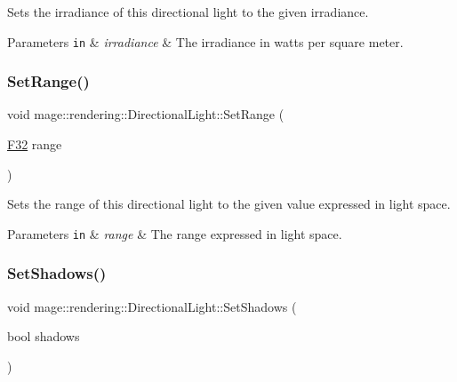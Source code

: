 Sets the irradiance of this directional light to the given irradiance.


\begin{DoxyParams}[1]{Parameters}
\mbox{\tt in}  & {\em irradiance} & The irradiance in watts per square meter. \\
\hline
\end{DoxyParams}
\mbox{\label{classmage_1_1rendering_1_1_directional_light_a4cfe435db538b10a6bc3aeab9c71dd45}} 
\subsubsection{\texorpdfstring{Set\+Range()}{SetRange()}}
{\footnotesize\ttfamily void mage\+::rendering\+::\+Directional\+Light\+::\+Set\+Range (\begin{DoxyParamCaption}\item[{\mbox{\hyperlink{namespacemage_aa97e833b45f06d60a0a9c4fc22ae02c0}{F32}}}]{range }\end{DoxyParamCaption})\hspace{0.3cm}{\ttfamily [noexcept]}}

Sets the range of this directional light to the given value expressed in light space.


\begin{DoxyParams}[1]{Parameters}
\mbox{\tt in}  & {\em range} & The range expressed in light space. \\
\hline
\end{DoxyParams}
\mbox{\label{classmage_1_1rendering_1_1_directional_light_a4a8aa135c9366993f6343b33cd4ed9e0}} 
\subsubsection{\texorpdfstring{Set\+Shadows()}{SetShadows()}}
{\footnotesize\ttfamily void mage\+::rendering\+::\+Directional\+Light\+::\+Set\+Shadows (\begin{DoxyParamCaption}\item[{bool}]{shadows }\end{DoxyParamCaption})\hspace{0.3cm}{\ttfamily [noexcept]}}

